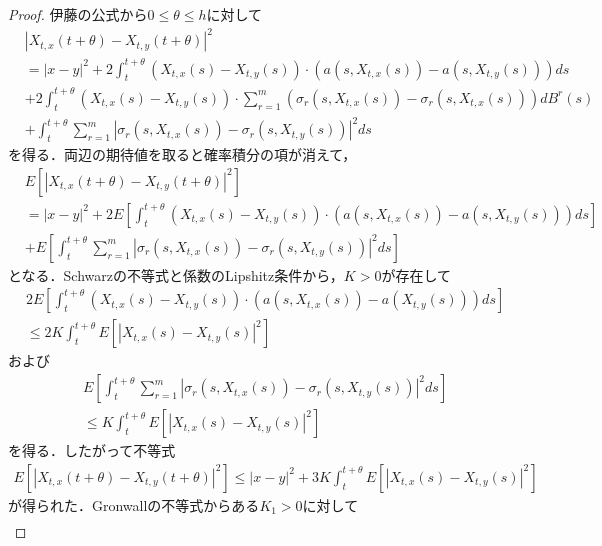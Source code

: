\documentclass[dvipdfmx,autodetect-engine]{jsarticle}
\theoremstyle{remark}
\theoremstyle{definition}
\newcommand{\abs}[1]{\left\lvert#1\right\rvert}
\begin{document}
\begin{proof}
    伊藤の公式から$0\leq \theta \leq h$に対して
    \begin{align}
        &\abs{X_{t,x}(t+\theta)-X_{t,y}(t+\theta)}^{2} \\
        &= \abs{x-y}^{2} + 
        2\int_{t}^{t+\theta} (X_{t,x}(s)-X_{t,y}(s))\cdot (a(s,X_{t,x}(s))-a(s,X_{t,y}(s)))ds \\
        &+ 2\int_{t}^{t+\theta} (X_{t,x}(s)-X_{t,y}(s)) 
        \cdot \sum_{r=1}^{m} (\sigma_{r}(s,X_{t,x}(s))-\sigma_{r}(s,X_{t,x}(s))) dB^{r}(s)\\
        &+ \int_{t}^{t+\theta} \sum_{r=1}^{m} 
        \abs{\sigma_{r}(s,X_{t,x}(s))-\sigma_{r}(s,X_{t,y}(s))}^{2} ds
    \end{align}
    を得る．両辺の期待値を取ると確率積分の項が消えて，
    \begin{align}
        &E[\abs{X_{t,x}(t+\theta)-X_{t,y}(t+\theta)}^{2}] \\
        &= \abs{x-y}^{2} + 
        2E\left[\int_{t}^{t+\theta} (X_{t,x}(s)-X_{t,y}(s))
        \cdot (a(s,X_{t,x}(s))-a(s,X_{t,y}(s)))ds \right]\\
        &+ E\left[
            \int_{t}^{t+\theta} \sum_{r=1}^{m} 
        \abs{\sigma_{r}(s,X_{t,x}(s))-\sigma_{r}(s,X_{t,y}(s))}^{2} ds
        \right]
    \end{align}
    となる．Schwarzの不等式と係数のLipshitz条件から，$K>0$が存在して
    \begin{align}
        &2E\left[\int_{t}^{t+\theta} (X_{t,x}(s)-X_{t,y}(s))
        \cdot (a(s,X_{t,x}(s))-a(X_{t,y}(s)))ds \right]\\
        &\leq 2K \int_{t}^{t+\theta} E[\abs{X_{t,x}(s)-X_{t,y}(s)}^{2}]
    \end{align}
    および
    \begin{align}
        &E\left[
            \int_{t}^{t+\theta} \sum_{r=1}^{m} 
        \abs{\sigma_{r}(s,X_{t,x}(s))-\sigma_{r}(s,X_{t,y}(s))}^{2} ds
        \right]\\
        &\leq K \int_{t}^{t+\theta} E[\abs{X_{t,x}(s)-X_{t,y}(s)}^{2}]
    \end{align}
    を得る．したがって不等式
    \begin{align}
        E[\abs{X_{t,x}(t+\theta)-X_{t,y}(t+\theta)}^{2}] \leq
        \abs{x-y}^{2} + 3K \int_{t}^{t+\theta} E[\abs{X_{t,x}(s)-X_{t,y}(s)}^{2}]
    \end{align}
    が得られた．Gronwallの不等式からある$K_{1}>0$に対して
    \begin{align}

\end{align}
\end{proof}
\end{document}
